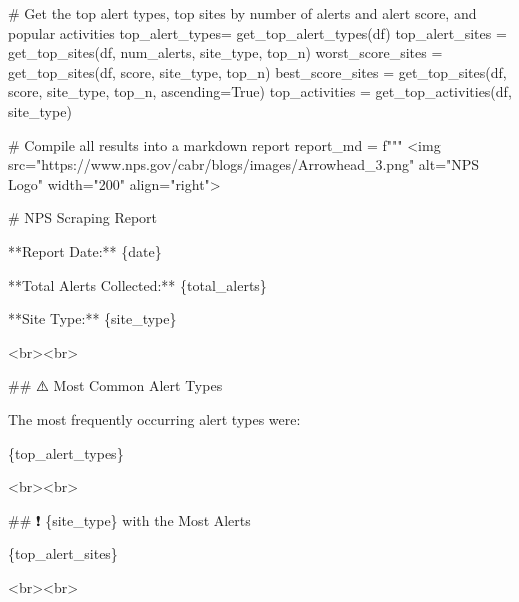 \documentclass[
  letterpaper,
  DIV=11,
  numbers=noendperiod]{scrartcl}
\newenvironment{Shaded}{\begin{snugshade}}{\end{snugshade}}
\newcommand{\CommentTok}[1]{\textcolor[rgb]{0.37,0.37,0.37}{#1}}
\newcommand{\NormalTok}[1]{\textcolor[rgb]{0.00,0.23,0.31}{#1}}
\newcommand{\OperatorTok}[1]{\textcolor[rgb]{0.37,0.37,0.37}{#1}}
\newcommand{\SpecialCharTok}[1]{\textcolor[rgb]{0.37,0.37,0.37}{#1}}
\newcommand{\SpecialStringTok}[1]{\textcolor[rgb]{0.13,0.47,0.30}{#1}}
\newcommand{\StringTok}[1]{\textcolor[rgb]{0.13,0.47,0.30}{#1}}
\newcommand{\VariableTok}[1]{\textcolor[rgb]{0.07,0.07,0.07}{#1}}
\begin{document}
\begin{Shaded}
\begin{Highlighting}[]
    \CommentTok{\# Get the top alert types, top sites by number of alerts and alert score, and popular activities}
\NormalTok{    top\_alert\_types}\OperatorTok{=}\NormalTok{ get\_top\_alert\_types(df)}
\NormalTok{    top\_alert\_sites }\OperatorTok{=}\NormalTok{ get\_top\_sites(df, }\StringTok{\textquotesingle{}num\_alerts\textquotesingle{}}\NormalTok{, site\_type, top\_n)}
\NormalTok{    worst\_score\_sites }\OperatorTok{=}\NormalTok{ get\_top\_sites(df, }\StringTok{\textquotesingle{}score\textquotesingle{}}\NormalTok{, site\_type, top\_n)}
\NormalTok{    best\_score\_sites }\OperatorTok{=}\NormalTok{ get\_top\_sites(df, }\StringTok{\textquotesingle{}score\textquotesingle{}}\NormalTok{, site\_type, top\_n, ascending}\OperatorTok{=}\VariableTok{True}\NormalTok{)}
\NormalTok{    top\_activities }\OperatorTok{=}\NormalTok{ get\_top\_activities(df, site\_type)}

    \CommentTok{\# Compile all results into a markdown report}
\NormalTok{    report\_md }\OperatorTok{=} \SpecialStringTok{f"""}
\SpecialStringTok{\textless{}img src="https://www.nps.gov/cabr/blogs/images/Arrowhead\_3.png" alt="NPS Logo" width="200" align="right"\textgreater{}}

\SpecialStringTok{\# NPS Scraping Report}

\SpecialStringTok{**Report Date:** }\SpecialCharTok{\{}\NormalTok{date}\SpecialCharTok{\}}

\SpecialStringTok{**Total Alerts Collected:** }\SpecialCharTok{\{}\NormalTok{total\_alerts}\SpecialCharTok{\}}

\SpecialStringTok{**Site Type:** }\SpecialCharTok{\{}\NormalTok{site\_type}\SpecialCharTok{\}}

\SpecialStringTok{\textless{}br\textgreater{}\textless{}br\textgreater{}}

\SpecialStringTok{\#\# ⚠️ Most Common Alert Types}

\SpecialStringTok{The most frequently occurring alert types were:}

\SpecialCharTok{\{}\NormalTok{top\_alert\_types}\SpecialCharTok{\}}

\SpecialStringTok{\textless{}br\textgreater{}\textless{}br\textgreater{}}

\SpecialStringTok{\#\# ❗ }\SpecialCharTok{\{}\NormalTok{site\_type}\SpecialCharTok{\}}\SpecialStringTok{ with the Most Alerts}

\SpecialCharTok{\{}\NormalTok{top\_alert\_sites}\SpecialCharTok{\}}

\SpecialStringTok{\textless{}br\textgreater{}\textless{}br\textgreater{}}


\end{Highlighting}
\end{Shaded}
\end{document}
